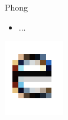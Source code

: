 \documentclass{lug}
\newcommand{\splitslide}[4]{
    \noindent
    \begin{minipage}{#1 \textwidth - #2 }
        #3
    \end{minipage}%
    \hspace{ \dimexpr #2 * 2 \relax }%
    \begin{minipage}{\textwidth - #1 \textwidth - #2 }
        #4
    \end{minipage}
}
\begin{document}
\begin{frame}{Phong}
    \splitslide{0.65}{.7em}{
        \small
        \begin{itemize}
            \item ...
        \end{itemize}
    }{
        \includegraphics[width=\textwidth]{graphics/subpixel_e}
    }
\end{frame}
\end{document}
